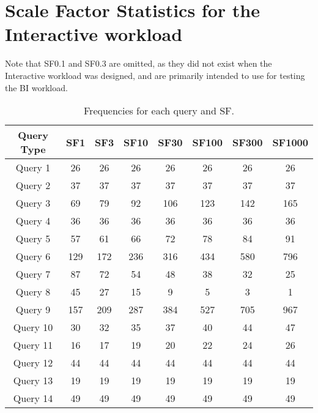\section{Scale Factor Statistics for the Interactive workload}\label{appendix:scale_factors}

Note that SF0.1 and SF0.3 are omitted, as they did not exist when the Interactive workload was designed, and are primarily intended to use for testing the BI workload.

\begin{table}[H]
\centering
\begin{tabular}{|c|c|c|c|c|c|c|c|}
   \hline
   \textbf{Query Type} & \textbf{SF1} & \textbf{SF3}& \textbf{SF10} & \textbf{SF30} & \textbf{SF100} & \textbf{SF300} & \textbf{SF1000} \\ 
   \hline
   \hline
   Query 1 & 26  & 26  & 26  & 26  & 26  & 26  & 26 \\ 
   \hline                                           
   Query 2 & 37  & 37  & 37  & 37  & 37  & 37  & 37 \\  
   \hline                                           
   Query 3 & 69  & 79  & 92  & 106 & 123 & 142 & 165\\ 
   \hline                                           
   Query 4 & 36  & 36  & 36  & 36  & 36  & 36  & 36 \\ 
   \hline                                           
   Query 5 & 57  & 61  & 66  & 72  & 78  & 84  & 91 \\ 
   \hline                                           
   Query 6 & 129 & 172 & 236 & 316 & 434 & 580 & 796\\  
   \hline                                           
   Query 7 & 87 & 72   & 54  & 48  & 38  & 32  & 25 \\ 
   \hline
   Query 8 & 45 &  27  & 15  & 9   & 5   & 3   & 1  \\ 
   \hline                                           
   Query 9 & 157 & 209 & 287 & 384 & 527 & 705 & 967\\  
   \hline                                           
   Query 10 & 30 & 32  & 35  & 37  & 40  & 44  & 47 \\ 
   \hline                                           
   Query 11 & 16 & 17  & 19  & 20  & 22  & 24  & 26 \\ 
   \hline                                           
   Query 12 & 44 & 44  & 44  & 44  & 44  & 44  & 44 \\ 
   \hline                                           
   Query 13 & 19 & 19  & 19  & 19  & 19  & 19  & 19 \\  
   \hline                                           
   Query 14 & 49 & 49  & 49  & 49  & 49  & 49  & 49 \\ 
   \hline
   \end{tabular}
   \caption{Frequencies for each query and SF.}
   \label{table:freqs_sf1}
\end{table}

